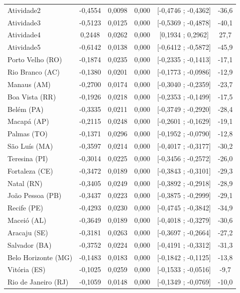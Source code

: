 \documentclass[12pt,a4paper,header]{abnt}
\begin{document}
\begin{center}
\begin{longtable}{lccccc}
Atividade2 & -0,4554 & 0,0098 & 0,000 & [-0,4746 ; -0,4362] & -36,6 \\
Atividade3 & -0,5123 & 0,0125 & 0,000 & [-0,5369 ; -0,4878] & -40,1 \\
Atividade4 & 0,2448 & 0,0262 & 0,000 & [0,1934 ; 0,2962] & 27,7 \\
Atividade5 & -0,6142 & 0,0138 & 0,000 & [-0,6412 ; -0,5872] & -45,9 \\
Porto Velho (RO) & -0,1874 & 0,0235 & 0,000 & [-0,2335 ; -0,1413] & -17,1 \\
Rio Branco (AC) & -0,1380 & 0,0201 & 0,000 & [-0,1773 ; -0,0986] & -12,9 \\
Manaus (AM) & -0,2700 & 0,0174 & 0,000 & [-0,3040 ; -0,2359] & -23,7 \\
Boa Vista (RR) & -0,1926 & 0,0218 & 0,000 & [-0,2353 ; -0,1499] & -17,5 \\
Belém (PA) & -0,3335 & 0,0211 & 0,000 & [-0,3749 ; -0,2920] & -28,4 \\
Macapá (AP) & -0,2115 & 0,0248 & 0,000 & [-0,2601 ; -0,1629] & -19,1 \\
Palmas (TO) & -0,1371 & 0,0296 & 0,000 & [-0,1952 ; -0,0790] & -12,8 \\
São Luís (MA) & -0,3597 & 0,0214 & 0,000 & [-0,4017 ; -0,3177] & -30,2 \\
Teresina (PI) & -0,3014 & 0,0225 & 0,000 & [-0,3456 ; -0,2572] & -26,0 \\
Fortaleza (CE) & -0,3472 & 0,0189 & 0,000 & [-0,3843 ; -0,3101] & -29,3 \\
Natal (RN) & -0,3405 & 0,0249 & 0,000 & [-0,3892 ; -0,2918] & -28,9 \\
João Pessoa (PB) & -0,3437 & 0,0223 & 0,000 & [-0,3875 ; -0,2999] & -29,1 \\
Recife (PE) & -0,4293 & 0,0230 & 0,000 & [-0,4745 ; -0,3842] & -34,9 \\
Maceió (AL) & -0,3649 & 0,0189 & 0,000 & [-0,4018 ; -0,3279] & -30,6 \\
Aracaju (SE) & -0,3181 & 0,0263 & 0,000 & [-0,3697 ; -0,2664] & -27,2 \\
Salvador (BA) & -0,3752 & 0,0224 & 0,000 & [-0,4191 ; -0,3312] & -31,3 \\
Belo Horizonte (MG) & -0,1483 & 0,0183 & 0,000 & [-0,1842 ; -0,1125] & -13,8 \\
Vitória (ES) & -0,1025 & 0,0259 & 0,000 & [-0,1533 ; -0,0516] & -9,7 \\
Rio de Janeiro (RJ) & -0,1059 & 0,0148 & 0,000 & [-0,1349 ; -0,0769] & -10,0 \\

\end{longtable}
\end{center}
\end{document}
